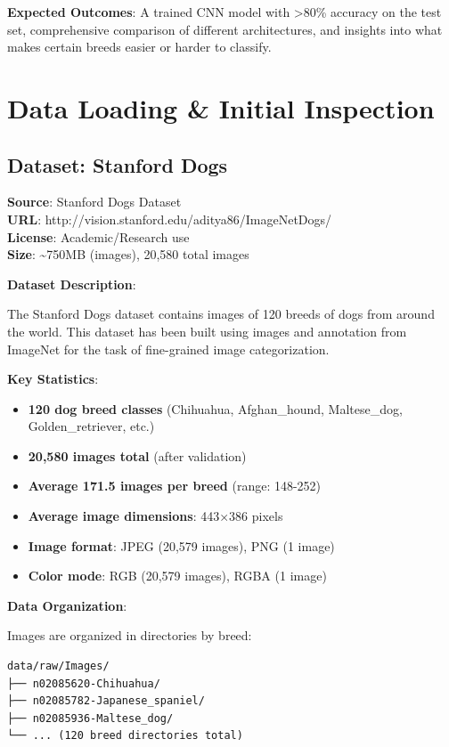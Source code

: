 \documentclass[
  letterpaper,
  DIV=11,
  numbers=noendperiod]{scrartcl}
\providecommand{\tightlist}{%
  \setlength{\itemsep}{0pt}\setlength{\parskip}{0pt}}
\begin{document}
\textbf{Expected Outcomes}: A trained CNN model with \textgreater80\%
accuracy on the test set, comprehensive comparison of different
architectures, and insights into what makes certain breeds easier or
harder to classify.

\section{Data Loading \& Initial
Inspection}\label{data-loading-initial-inspection}

\subsection{Dataset: Stanford Dogs}\label{dataset-stanford-dogs}

\textbf{Source}: Stanford Dogs Dataset\\
\textbf{URL}: http://vision.stanford.edu/aditya86/ImageNetDogs/\\
\textbf{License}: Academic/Research use\\
\textbf{Size}: \textasciitilde750MB (images), 20,580 total images

\textbf{Dataset Description}:

The Stanford Dogs dataset contains images of 120 breeds of dogs from
around the world. This dataset has been built using images and
annotation from ImageNet for the task of fine-grained image
categorization.

\textbf{Key Statistics}:

\begin{itemize}
\tightlist
\item
  \textbf{120 dog breed classes} (Chihuahua, Afghan\_hound,
  Maltese\_dog, Golden\_retriever, etc.)
\item
  \textbf{20,580 images total} (after validation)
\item
  \textbf{Average 171.5 images per breed} (range: 148-252)
\item
  \textbf{Average image dimensions}: 443×386 pixels
\item
  \textbf{Image format}: JPEG (20,579 images), PNG (1 image)
\item
  \textbf{Color mode}: RGB (20,579 images), RGBA (1 image)
\end{itemize}

\textbf{Data Organization}:

Images are organized in directories by breed:

\begin{verbatim}
data/raw/Images/
├── n02085620-Chihuahua/
├── n02085782-Japanese_spaniel/
├── n02085936-Maltese_dog/
└── ... (120 breed directories total)
\end{verbatim}
\end{document}

